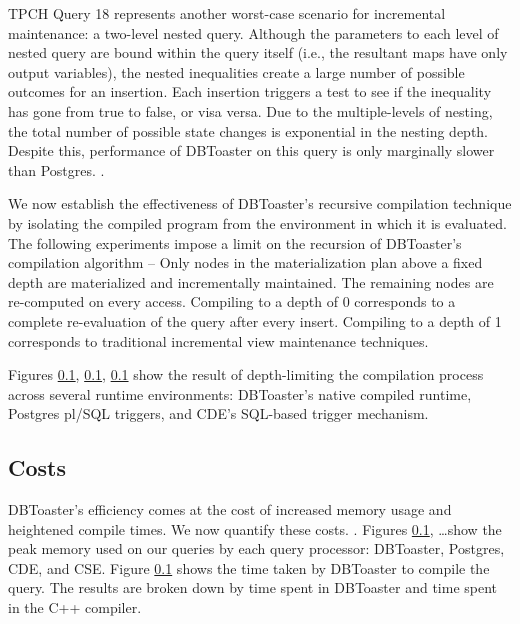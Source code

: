 TPCH Query 18 represents another worst-case scenario for incremental maintenance: a two-level nested query.  Although the parameters to each level of nested query are bound within the query itself (i.e., the resultant maps have only output variables), the nested inequalities create a large number of possible outcomes for an insertion.  Each insertion triggers a test to see if the inequality has gone from true to false, or visa versa.  Due to the multiple-levels of nesting, the total number of possible state changes is exponential in the nesting depth.  Despite this, performance of DBToaster on this query is only marginally slower than Postgres. .





We now establish the effectiveness of DBToaster's recursive compilation technique by isolating the compiled program from the environment in which it is evaluated.  The following experiments impose a limit on the recursion of DBToaster's compilation algorithm -- Only nodes in the materialization plan above a fixed depth are materialized and incrementally maintained.  The remaining nodes are re-computed on every access.  Compiling to a depth of 0 corresponds to a complete re-evaluation of the query after every insert.  Compiling to a depth of 1  corresponds to traditional incremental view maintenance techniques.  

Figures \ref{}, \ref{}, \ref{} show the result of depth-limiting the compilation process across several runtime environments: DBToaster's native compiled runtime, Postgres pl/SQL triggers, and CDE's SQL-based trigger mechanism.


\subsection{Costs}
DBToaster's efficiency comes at the cost of increased memory usage and heightened compile times.  We now quantify these costs.  .  Figures \ref{}, \ldots show the peak memory used on our queries by each query processor: DBToaster, Postgres, CDE, and CSE.  Figure \ref{} shows the time taken by DBToaster to compile the query.  The results are  broken down by time spent in DBToaster  and time spent in the C++ compiler.

